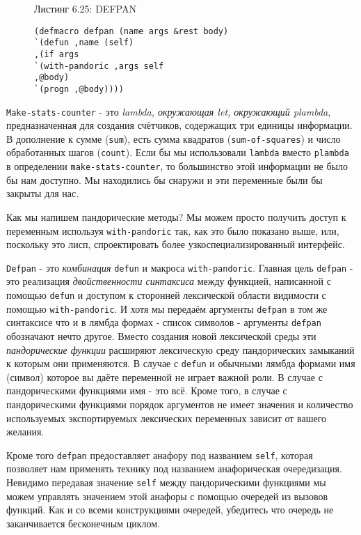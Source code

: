 \begin{figure}Листинг 6.25: DEFPAN\label{listing_6.25}
\listbegin
\begin{verbatim}
(defmacro defpan (name args &rest body)
`(defun ,name (self)
,(if args
`(with-pandoric ,args self
,@body)
`(progn ,@body))))
\end{verbatim}
\listend
\end{figure}

\verb"Make-stats-counter" - это \emph{lambda, окружающая let, окружающий {p\-lamb\-da}}, предназначенная для создания счётчиков, содержащих три единицы информации. В дополнение к сумме (\verb"sum"), есть сумма квадратов (\verb"sum-of-squares") и число обработанных шагов (\verb"count"). Если бы мы использовали \verb"lambda" вместо \verb"plambda" в определении \verb"make-stats-counter", то большинство этой информации не было бы нам доступно. Мы находились бы снаружи и эти переменные были бы закрыты для нас.

Как мы напишем пандорические методы? Мы можем просто получить доступ к переменным используя \verb"with-pandoric" так, как это было показано выше, или, поскольку это лисп, спроектировать более узкоспециализированный интерфейс.

\verb"Defpan" - это \emph{комбинация} \verb"defun" и макроса \verb"with-pandoric". Главная цель \verb"defpan" - это реализация \emph{двойственности синтаксиса} между функцией, написанной с помощью \verb"defun" и доступом к сторонней лексической области видимости с помощью \verb"with-pandoric". И хотя мы передаём аргументы \verb"defpan" в том же синтаксисе что и в лямбда формах - список символов - аргументы \verb"defpan" обозначают нечто другое. Вместо создания новой лексической среды эти \emph{пандорические функции} расширяют лексическую среду пандорических замыканий к которым они применяются. В случае с \verb"defun" и обычными лямбда формами имя (символ) которое вы даёте переменной не играет важной роли. В случае с пандорическими функциями имя - это всё. Кроме того, в случае с пандорическими функциями порядок аргументов не имеет значения и количество используемых экспортируемых лексических переменных зависит от вашего желания.

Кроме того \verb"defpan" предоставляет анафору под названием \verb"self", которая позволяет нам применять технику под названием анафорическая очередизация. Невидимо передавая значение \verb"self" между пандорическими функциями мы можем управлять значением этой анафоры с помощью очередей из вызовов функций. Как и со всеми конструкциями очередей, убедитесь что очередь не заканчивается бесконечным циклом.

